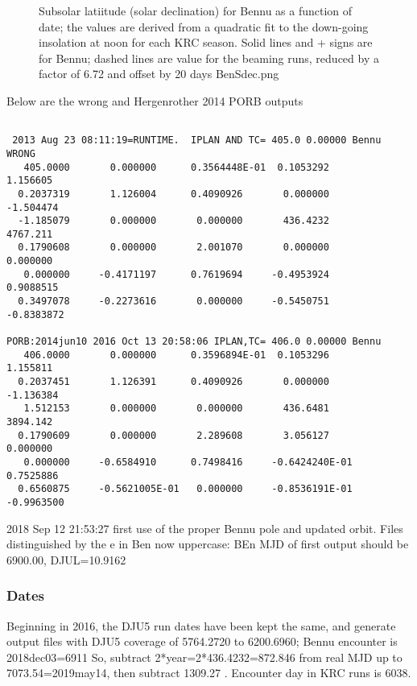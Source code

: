 \documentclass{article}
\begin{document}
\begin{figure}[!ht] 
\caption[Sub-solar latitude]{Subsolar latiitude (solar declination) for Bennu as
  a function of date; the values are derived from a quadratic fit to the
  down-going insolation at noon for each KRC season.  Solid lines and + signs
  are for Bennu; dashed lines are value for the beaming runs, reduced by a
  factor of 6.72 and offset by 20 days
\label{BenSdec}  BenSdec.png  }
\end{figure} 

Below are the wrong and Hergenrother 2014 PORB outputs
\vspace{-3.mm} 
\begin{verbatim}
    
 2013 Aug 23 08:11:19=RUNTIME.  IPLAN AND TC= 405.0 0.00000 Bennu   WRONG   
   405.0000       0.000000      0.3564448E-01  0.1053292       1.156605    
  0.2037319       1.126004      0.4090926       0.000000      -1.504474    
  -1.185079       0.000000       0.000000       436.4232       4767.211    
  0.1790608       0.000000       2.001070       0.000000       0.000000    
   0.000000     -0.4171197      0.7619694     -0.4953924      0.9088515    
  0.3497078     -0.2273616       0.000000     -0.5450751     -0.8383872  

PORB:2014jun10 2016 Oct 13 20:58:06 IPLAN,TC= 406.0 0.00000 Bennu
   406.0000       0.000000      0.3596894E-01  0.1053296       1.155811    
  0.2037451       1.126391      0.4090926       0.000000      -1.136384    
   1.512153       0.000000       0.000000       436.6481       3894.142    
  0.1790609       0.000000       2.289608       3.056127       0.000000    
   0.000000     -0.6584910      0.7498416     -0.6424240E-01  0.7525886    
  0.6560875     -0.5621005E-01   0.000000     -0.8536191E-01 -0.9963500
\end{verbatim} 

 2018 Sep 12 21:53:27 first use of the proper Bennu pole and updated orbit.
 Files distinguished by the e in Ben now uppercase: BEn
MJD of first output should be 6900.00, DJUL=10.9162


\subsubsection{Dates}
Beginning in 2016, the DJU5 run dates have been kept the same, and generate
output files with DJU5 coverage of 5764.2720 to 6200.6960; Bennu encounter is
2018dec03=6911 So, subtract 2*year=2*436.4232=872.846 from real MJD up to
7073.54=2019may14, then subtract 1309.27 . Encounter day in KRC runs is 6038.
\end{document}
